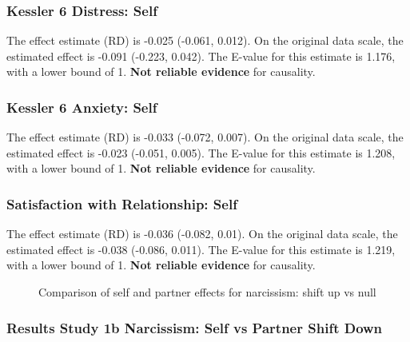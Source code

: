 \documentclass[
  singlecolumn]{article}
\begin{document}
\subsubsection{Kessler 6 Distress:
Self}\label{kessler-6-distress-self-6}

The effect estimate (RD) is -0.025 (-0.061, 0.012). On the original data
scale, the estimated effect is -0.091 (-0.223, 0.042). The E-value for
this estimate is 1.176, with a lower bound of 1. \textbf{Not reliable
evidence} for causality.

\subsubsection{Kessler 6 Anxiety: Self}\label{kessler-6-anxiety-self-6}

The effect estimate (RD) is -0.033 (-0.072, 0.007). On the original data
scale, the estimated effect is -0.023 (-0.051, 0.005). The E-value for
this estimate is 1.208, with a lower bound of 1. \textbf{Not reliable
evidence} for causality.

\subsubsection{Satisfaction with Relationship:
Self}\label{satisfaction-with-relationship-self-6}

The effect estimate (RD) is -0.036 (-0.082, 0.01). On the original data
scale, the estimated effect is -0.038 (-0.086, 0.011). The E-value for
this estimate is 1.219, with a lower bound of 1. \textbf{Not reliable
evidence} for causality.

\begin{figure}


\caption{\label{fig-results-narcissism-self-partner-up-comparison}Comparison
of self and partner effects for narcissism: shift up vs null}

\end{figure}%

\newpage{}

\subsubsection{Results Study 1b Narcissism: Self vs Partner Shift
Down}\label{results-study-1b-narcissism-self-vs-partner-shift-down}
\end{document}
